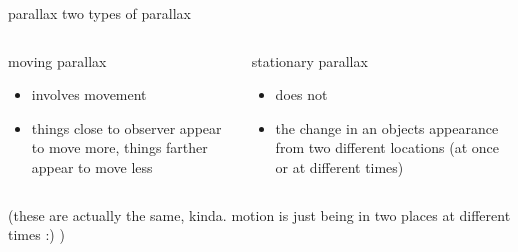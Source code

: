 \documentclass[12pt]{beamer}
\begin{document}
        \begin{frame}{parallax} \centering
            two types of parallax
            \pause
            \begin{columns}
                \begin{column}{0.5\linewidth}
                    \begin{block}{moving parallax}
                        \begin{itemize}
                            \item<3-> involves movement
                            \item<4-> things close to observer appear to move more, things farther appear to move less
                        \end{itemize}
                    \end{block}
                \end{column}
                \begin{column}{0.5\linewidth}
                    \begin{block}{stationary parallax}
                        \begin{itemize}
                            \item<3-> does not
                            \item<4-> the change in an objects appearance from two different locations (at once or at different times)
                        \end{itemize}
                    \end{block}
                \end{column}
            \end{columns}
            \pause[5] \vspace{1em}
            (these are actually the same, kinda. motion is just being in two places at different times :) )
        \end{frame}
\end{document}
